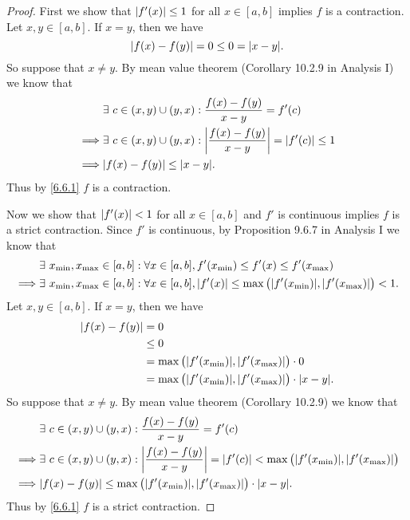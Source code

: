 \begin{proof}
  First we show that \(\left\lvert f'(x)\right\rvert \leq 1\) for all \(x \in [a, b]\) implies \(f\) is a contraction.
  Let \(x, y \in [a, b]\).
  If \(x = y\), then we have
  \[
    \abs{f(x) - f(y)} = 0 \leq 0 = \abs{x - y}.
  \]
  So suppose that \(x \neq y\).
  By mean value theorem (Corollary 10.2.9 in Analysis I) we know that
  \begin{align*}
             & \exists\ c \in (x, y) \cup (y, x) : \frac{f(x) - f(y)}{x - y} = f'(c)                    \\
    \implies & \exists\ c \in (x, y) \cup (y, x) : \abs{\frac{f(x) - f(y)}{x - y}} = \abs{f'(c)} \leq 1 \\
    \implies & \abs{f(x) - f(y)} \leq \abs{x - y}.
  \end{align*}
  Thus by \cref{6.6.1} \(f\) is a contraction.

  Now we show that \(\left\lvert f'(x)\right\rvert < 1\) for all \(x \in [a, b]\) and \(f'\) is continuous implies \(f\) is a strict contraction.
  Since \(f'\) is continuous, by Proposition 9.6.7 in Analysis I we know that
  \begin{align*}
             & \exists\ x_{\min}, x_{\max} \in [a, b] : \forall x \in [a, b], f'(x_{\min}) \leq f'(x) \leq f'(x_{\max})                                  \\
    \implies & \exists\ x_{\min}, x_{\max} \in [a, b] : \forall x \in [a, b], \abs{f'(x)} \leq \max\big(\abs{f'(x_{\min})}, \abs{f'(x_{\max})}\big) < 1.
  \end{align*}
  Let \(x, y \in [a, b]\).
  If \(x = y\), then we have
  \begin{align*}
    \abs{f(x) - f(y)} & = 0                                                                       \\
                      & \leq 0                                                                    \\
                      & = \max\big(\abs{f'(x_{\min})}, \abs{f'(x_{\max})}\big) \cdot 0            \\
                      & = \max\big(\abs{f'(x_{\min})}, \abs{f'(x_{\max})}\big) \cdot \abs{x - y}.
  \end{align*}
  So suppose that \(x \neq y\).
  By mean value theorem (Corollary 10.2.9) we know that
  \begin{align*}
             & \exists\ c \in (x, y) \cup (y, x) : \frac{f(x) - f(y)}{x - y} = f'(c)                                                                    \\
    \implies & \exists\ c \in (x, y) \cup (y, x) : \abs{\frac{f(x) - f(y)}{x - y}} = \abs{f'(c)} < \max\big(\abs{f'(x_{\min})}, \abs{f'(x_{\max})}\big) \\
    \implies & \abs{f(x) - f(y)} \leq \max\big(\abs{f'(x_{\min})}, \abs{f'(x_{\max})}\big) \cdot \abs{x - y}.
  \end{align*}
  Thus by \cref{6.6.1} \(f\) is a strict contraction.
\end{proof}

